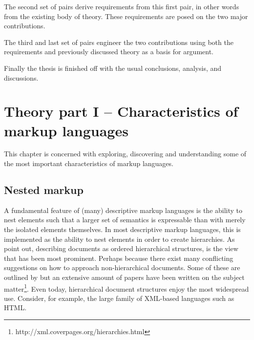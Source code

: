 \documentclass{scrreprt}
\begin{document}
The second set of pairs derive requirements from this first pair, in other words from the existing body of theory. These requirements are posed on the two major contributions.

The third and last set of pairs engineer the two contributions using both the requirements and previously discussed theory as a basis for argument.

Finally the thesis is finished off with the usual conclusions, analysis, and discussions.


























%
%
%
%
%
%


\chapter{Theory part I -- Characteristics of markup languages}
\label{sec:theory}
This chapter is concerned with exploring, discovering and understanding some of the most important characteristics of markup languages.


\section{Nested markup}
\label{sec:nesting}
A fundamental feature of (many) descriptive markup languages is the ability to nest elements such that a larger set of semantics is expressable than with merely the isolated elements themselves. In most descriptive markup languages, this is implemented as the ability to nest elements in order to create hierarchies. As \citet*{durand} point out, describing documents as ordered hierarchical structures, is the view that has been most prominent. Perhaps because there exist many conflicting suggestions on how to approach non-hierarchical documents. Some of these are outlined by \citet{durand} but an extensive amount of papers have been written on the subject matter\footnote{http://xml.coverpages.org/hierarchies.html}. Even today, hierarchical document structures enjoy the most widespread use. Consider, for example, the large family of XML-based languages such as HTML.
\end{document}
